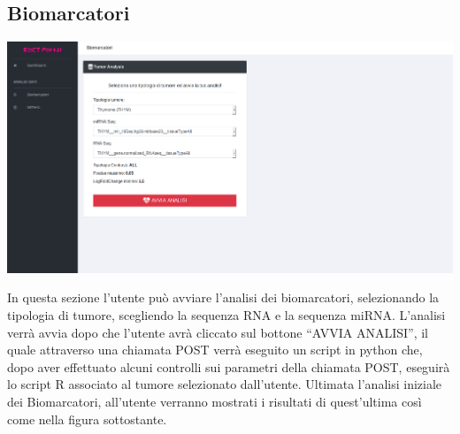 \documentclass[10pt,a4paper]{report}
\newcommand{\virgolette}[1]{``#1''}
\begin{document}
\subsection{Biomarcatori}
\begin{center}
\includegraphics[scale=0.18]{Biomarcatori.png} 
\end{center}
In questa sezione l’utente può avviare l’analisi dei biomarcatori, selezionando la tipologia di tumore, scegliendo la sequenza RNA e la sequenza miRNA. L’analisi verrà avvia dopo che l’utente avrà cliccato sul bottone \virgolette{AVVIA ANALISI}, il quale attraverso una chiamata POST verrà eseguito un script in python che, dopo aver effettuato alcuni controlli sui parametri della chiamata POST, eseguirà lo script R associato al tumore selezionato dall’utente. Ultimata l’analisi iniziale dei Biomarcatori, all’utente verranno mostrati i risultati di quest’ultima così come nella figura sottostante.
\end{document}
